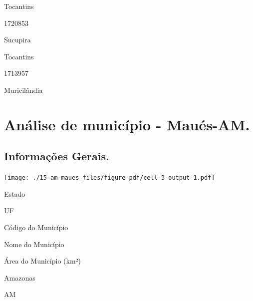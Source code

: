 \documentclass[
  letterpaper,
]{report}
\begin{document}
Tocantins

\n      

1720853

\n      

Sucupira

\n    

\n    

\n      

Tocantins

\n      

1713957

\n      

Muricilândia

\n    

\n  

\n


\hypertarget{anuxe1lise-de-municuxedpio---mauuxe9s-am.}{%
\chapter{Análise de município -
Maués-AM.}\label{anuxe1lise-de-municuxedpio---mauuxe9s-am.}}

\hypertarget{informauxe7uxf5es-gerais.-1}{%
\section{Informações Gerais.}\label{informauxe7uxf5es-gerais.-1}}

\texttt{[image: ./15-am-maues\_files/figure-pdf/cell-3-output-1.pdf]}

\n  

\n    

\n      

Estado

\n      

UF

\n      

Código do Município

\n      

Nome do Município

\n      

Área do Município (km²)

\n    

\n  

\n  

\n    

\n      

Amazonas

\n      

AM
\end{document}
